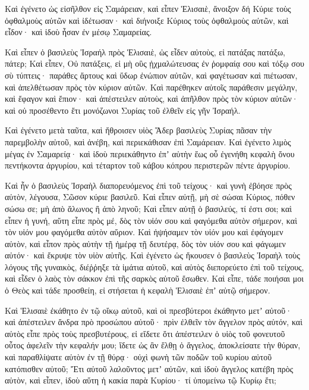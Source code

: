 {Καὶ ἐγένετο ὡς εἰσῆλθον εἰς Σαμάρειαν, καὶ εἶπεν Ἑλισαιὲ, ἄνοιξον δή Κύριε τοὺς ὀφθαλμοὺς αὐτῶν καὶ ἰδέτωσαν· καὶ διήνοιξε Κύριος τοὺς ὀφθαλμοὺς αὐτῶν, καὶ εἶδον· καὶ ἰδοὺ ἦσαν ἐν μέσῳ Σαμαρείας.
\par }{\PP {}Καὶ εἶπεν ὁ βασιλεὺς Ἰσραήλ πρὸς Ἑλισαιὲ, ὡς εἶδεν αὐτοὺς, εἰ πατάξας πατάξω, πάτερ;
Καὶ εἶπεν, Οὐ πατάξεις, εἰ μὴ οὓς ᾐχμαλώτευσας ἐν ῥομφαίᾳ σου καὶ τόξῳ σου σὺ τύπτεις· παράθες ἄρτους καὶ ὕδωρ ἐνώπιον αὐτῶν, καὶ φαγέτωσαν καὶ πιέτωσαν, καὶ ἀπελθέτωσαν πρὸς τὸν κύριον αὐτῶν.
Καὶ παρέθηκεν αὐτοῖς παράθεσιν μεγάλην, καὶ ἔφαγον καὶ ἔπιον· καὶ ἀπέστειλεν αὐτοὺς, καὶ ἀπῆλθον πρὸς τὸν κύριον αὐτῶν· καὶ οὐ προσέθεντο ἔτι μονόζωνοι Συρίας τοῦ ἐλθεῖν εἰς γῆν Ἰσραήλ.
\par }{\PP {}Καὶ ἐγένετο μετὰ ταῦτα, καὶ ἤθροισεν υἱὸς Ἅδερ βασιλεὺς Συρίας πᾶσαν τὴν παρεμβολὴν αὐτοῦ, καὶ ἀνέβη, καὶ περιεκάθισαν ἐπὶ Σαμάρειαν.
Καὶ ἐγένετο λιμὸς μέγας ἐν Σαμαρείᾳ· καὶ ἰδοὺ περιεκάθηντο ἐπʼ αὐτὴν ἕως οὗ ἐγενήθη κεφαλὴ ὄνου πεντήκοντα ἀργυρίου, καὶ τέταρτον τοῦ κάβου κόπρου περιστερῶν πέντε ἀργυρίου.
\par }{\PP {}Καὶ ἦν ὁ βασιλεὺς Ἰσραὴλ διαπορευόμενος ἐπὶ τοῦ τείχους· καὶ γυνὴ ἐβόησε πρὸς αὐτὸν, λέγουσα, Σῶσον κύριε βασιλεῦ.
Καὶ εἶπεν αὐτῇ, μὴ σὲ σώσαι Κύριος, πόθεν σώσω σε; μὴ ἀπὸ ἅλωνος ἢ ἀπὸ ληνοῦ;
Καὶ εἶπεν αὐτῇ ὁ βασιλεύς, τί ἐστι σοι; καὶ εἶπεν ἡ γυνή, αὕτη εἶπε πρὸς μέ, δὸς τὸν υἱόν σου καὶ φαγόμεθα αὐτὸν σήμερον, καὶ τὸν υἱόν μου φαγόμεθα αὐτὸν αὔριον.
Καὶ ἡψήσαμεν τὸν υἱόν μου καὶ ἐφάγομεν αὐτὸν, καὶ εἶπον πρὸς αὐτὴν τῇ ἡμέρᾳ τῇ δευτέρᾳ, δὸς τὸν υἱόν σου καὶ φάγωμεν αὐτόν· καὶ ἔκρυψε τὸν υἱὸν αὐτῆς.
Καὶ ἐγένετο ὡς ἤκουσεν ὁ βασιλεὺς Ἰσραὴλ τοὺς λόγους τῆς γυναικὸς, διέῤῥηξε τὰ ἱμάτια αὐτοῦ, καὶ αὐτὸς διεπορεύετο ἐπὶ τοῦ τείχους, καὶ εἶδεν ὁ λαὸς τὸν σάκκον ἐπὶ τῆς σαρκὸς αὑτοῦ ἔσωθεν.
Καὶ εἶπε, τάδε ποιήσαι μοι ὁ Θεὸς καὶ τάδε προσθείη, εἰ στήσεται ἡ κεφαλὴ Ἑλισαιὲ ἐπʼ αὐτῷ σήμερον.
\par }{\PP {}Καὶ Ἑλισαιὲ ἐκάθητο ἐν τῷ οἴκῳ αὐτοῦ, καὶ οἱ πρεσβύτεροι ἐκάθηντο μετʼ αὐτοῦ· καὶ ἀπέστειλεν ἄνδρα πρὸ προσώπου αὐτοῦ· πρὶν ἐλθεῖν τὸν ἄγγελον πρὸς αὐτόν, καὶ αὐτὸς εἶπε πρὸς τοὺς πρεσβυτέρους, εἰ εἴδετε ὅτι ἀπέστειλεν ὁ υἱὸς τοῦ φονευτοῦ οὗτος ἀφελεῖν τὴν κεφαλήν μου; ἴδετε ὡς ἂν ἔλθῃ ὁ ἄγγελος, ἀποκλείσατε τὴν θύραν, καὶ παραθλίψατε αὐτὸν ἐν τῇ θύρᾳ· οὐχὶ φωνὴ τῶν ποδῶν τοῦ κυρίου αὐτοῦ κατόπισθεν αὐτοῦ;
Ἔτι αὐτοῦ λαλοῦντος μετʼ αὐτῶν, καὶ ἰδοὺ ἄγγελος κατέβη πρὸς αὐτὸν, καὶ εἶπεν, ἰδοὺ αὕτη ἡ κακία παρὰ Κυρίου· τί ὑπομείνω τῷ Κυρίῳ ἔτι;

}
